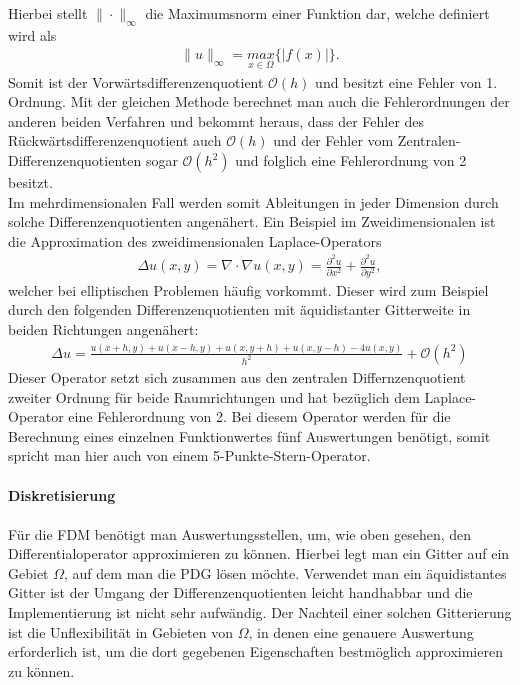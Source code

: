 \documentclass[12pt,titlepage]{article}
\begin{document}
Hierbei stellt $\|\cdot\|_{\infty}$ die Maximumsnorm einer Funktion dar, welche definiert wird als
\begin{align}
 \|u\|_{\infty}=\underset{x\in\Omega}{max}\{|f(x)|\}.\nonumber
\end{align}
Somit ist der Vorwärtsdifferenzenquotient $\mathcal{O}(h)$ und besitzt eine Fehler von 1. Ordnung. Mit der gleichen Methode berechnet man auch die Fehlerordnungen der anderen beiden Verfahren und bekommt heraus, dass der Fehler des Rückwärtsdifferenzenquotient auch $\mathcal{O}(h)$ und der Fehler vom Zentralen-Differenzenquotienten sogar $\mathcal{O}(h^2)$ und folglich eine Fehlerordnung von 2 besitzt.\\
Im mehrdimensionalen Fall werden somit Ableitungen in jeder Dimension durch solche Differenzenquotienten angenähert. Ein Beispiel im Zweidimensionalen ist die Approximation des zweidimensionalen Laplace-Operators
\begin{align}
 \Delta u(x,y)=\nabla\cdot\nabla u(x,y)=\frac{\partial^2u}{\partial x^2}+\frac{\partial^2u}{\partial y^2},
\end{align}
welcher bei elliptischen Problemen häufig vorkommt. Dieser wird zum Beispiel durch den folgenden Differenzenquotienten mit äquidistanter Gitterweite in beiden Richtungen angenähert:
 \small
\begin{align}
 \Delta u=\frac{u(x+h,y)+u(x-h,y)+u(x,y+h)+u(x,y-h)-4u(x,y)}{h^2}+\mathcal{O}(h^2)\nonumber
\end{align}
\normalsize
Dieser Operator setzt sich zusammen aus den zentralen Differnzenquotient zweiter Ordnung für beide Raumrichtungen und hat bezüglich dem Laplace-Operator eine Fehlerordnung von 2. Bei diesem Operator werden für die Berechnung eines einzelnen Funktionwertes fünf Auswertungen benötigt, somit spricht man hier auch von einem 5-Punkte-Stern-Operator.\\\\
\textbf{Diskretisierung}\\\\
Für die FDM benötigt man Auswertungsstellen, um, wie oben gesehen, den Differentialoperator approximieren zu können. Hierbei legt man ein Gitter auf ein Gebiet $\Omega$, auf dem man die PDG lösen möchte. Verwendet man ein äquidistantes Gitter ist der Umgang der Differenzenquotienten leicht handhabbar und die Implementierung ist nicht sehr aufwändig. Der Nachteil einer solchen Gitterierung ist die Unflexibilität in Gebieten von $\Omega$, in denen eine genauere Auswertung erforderlich ist, um die dort gegebenen Eigenschaften bestmöglich approximieren zu können.\\
\end{document}
